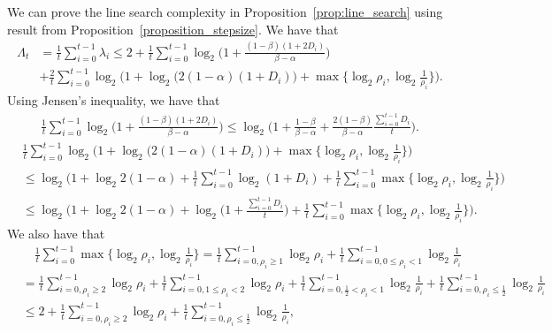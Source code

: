 \documentclass[11pt,letterpaper]{article}
\newcommand\0{{\Vector{0}}}
\newcommand\1{{\Vector{1}}}
\numberwithin{assumption}{section}
\numberwithin{definition}{section}
\numberwithin{theorem}{section}
\numberwithin{remark}{section}
\begin{document}
    We can prove the line search complexity in Proposition~\ref{prop:line_search} using result from Proposition~\ref{proposition_stepsize}. We have that
    \begin{equation}\label{thm:line_search_proof_1}
    \begin{split}
        \Lambda_t & = \frac{1}{t}\sum_{i = 0}^{t - 1} \lambda_i  \leq 2 + \frac{1}{t}\sum_{i = 0}^{t - 1}\log_{2}\Big(1 + \frac{(1 - \beta)(1 + 2D_i)}{\beta - \alpha}\Big) \\
        & + \frac{2}{t}\sum_{i = 0}^{t - 1}\log_{2}\Big(1 + \log_{2}\big(2(1 - \alpha)(1 + D_i)\big) + \max\{\log_{2}\rho_i, \log_{2}\frac{1}{\rho_i}\}\Big).
    \end{split}
    \end{equation}
    Using Jensen's inequality, we have that
    \begin{equation}\label{thm:line_search_proof_2}
    \begin{split}
        \frac{1}{t}\sum_{i = 0}^{t - 1}\log_{2}\Big(1 + \frac{(1 - \beta)(1 + 2D_i)}{\beta - \alpha}\Big) \leq \log_{2}\Big(1 + \frac{1 - \beta}{\beta - \alpha} + \frac{2(1 - \beta)}{\beta - \alpha}\frac{\sum_{i = 0}^{t - 1}D_i}{t}\Big).
    \end{split}
    \end{equation}
    \begin{equation}\label{thm:line_search_proof_3}
    \begin{split}
        & \frac{1}{t}\sum_{i = 0}^{t - 1}\log_{2}\Big(1 + \log_{2}\big(2(1 - \alpha)(1 + D_i)\big) + \max\{\log_{2}\rho_i, \log_{2}\frac{1}{\rho_i}\}\Big) \\
        & \leq \log_{2}\Big(1 +\log_{2}2(1 - \alpha) + \frac{1}{t}\sum_{i = 0}^{t - 1}\log_{2}(1 + D_i) + \frac{1}{t}\sum_{i = 0}^{t - 1}\max\{\log_{2}\rho_i, \log_{2}\frac{1}{\rho_i}\}\Big) \\
        & \leq \log_{2}\Big(1 +\log_{2}2(1 - \alpha) + \log_{2}\big(1 + \frac{\sum_{i = 0}^{t - 1}D_i}{t}) + \frac{1}{t}\sum_{i = 0}^{t - 1}\max\{\log_{2}\rho_i, \log_{2}\frac{1}{\rho_i}\}\Big).
    \end{split}
    \end{equation}
    We also have that
    \begin{equation}\label{thm:line_search_proof_4}
    \begin{split}
        & \quad \frac{1}{t}\sum_{i = 0}^{t - 1}\max\{\log_{2}\rho_i, \log_{2}\frac{1}{\rho_i}\} = \frac{1}{t}\sum_{i = 0, \rho_i \geq 1}^{t - 1}\log_{2}\rho_i + \frac{1}{t}\sum_{i = 0, 0 \leq \rho_i < 1}^{t - 1}\log_{2}\frac{1}{\rho_i} \\
        & = \frac{1}{t}\sum_{i = 0, \rho_i \geq 2}^{t - 1}\log_{2}\rho_i + \frac{1}{t}\sum_{i = 0, 1 \leq \rho_i < 2}^{t - 1}\log_{2}\rho_i + \frac{1}{t}\sum_{i = 0, \frac{1}{2} < \rho_i < 1}^{t - 1}\log_{2}\frac{1}{\rho_i} + \frac{1}{t}\sum_{i = 0, \rho_i \leq \frac{1}{2}}^{t - 1}\log_{2}\frac{1}{\rho_i} \\
        & \leq 2 + \frac{1}{t}\sum_{i = 0, \rho_i \geq 2}^{t - 1}\log_{2}\rho_i + \frac{1}{t}\sum_{i = 0, \rho_i \leq \frac{1}{2}}^{t - 1}\log_{2}\frac{1}{\rho_i},
    \end{split}
    \end{equation}
\end{document}
